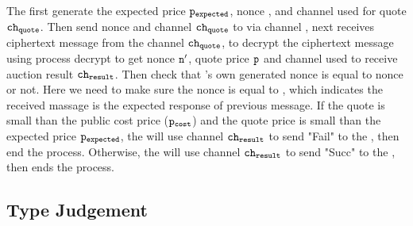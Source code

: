 \documentclass[master,english]{kuisthesis}
\theoremstyle{definition}
\begin{document}
The  first generate the expected price ${\tt p_{expected}}$, nonce , and channel used for quote ${\tt ch_{quote}}$. Then send nonce  and channel ${\tt ch_{quote}}$ to  via channel , next  receives ciphertext message  from the channel  ${\tt ch_{quote}}$, to decrypt the ciphertext message  using process decrypt to get nonce ${\tt n'}$, quote price ${\tt p}$ and channel used to receive auction result ${\tt ch_{result}}$. Then check that 's own generated nonce  is equal to nonce  or not. Here we need to make sure the nonce  is equal to , which indicates the received massage is the expected response of previous message.  If the quote  is small than the public cost price (${\tt p_{cost}}$) and the quote price  is small than the expected price ${\tt p_{expected}}$, the  will use channel ${\tt ch_{result}}$ to send "Fail" to the , then end the process. Otherwise, the  will use channel ${\tt ch_{result}}$ to send "Succ" to the , then ends the process.


\subsection{Type Judgement}
\end{document}
